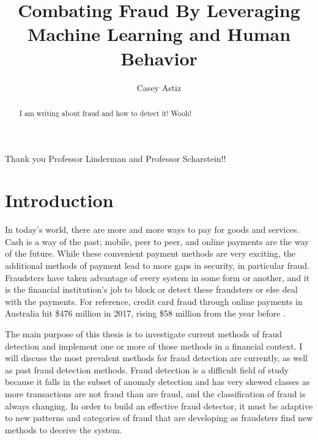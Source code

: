 \documentclass[midd]{thesis}
\title {Combating Fraud By Leveraging Machine Learning and Human Behavior}
\author {Casey Astiz}
\begin{document}
\maketitle
{}

\begin{abstract}
I am writing about fraud and how to detect it! Wooh!
\end{abstract}

\begin{acknowledgements}
Thank you Professor Linderman and Professor Scharstein!!
\end{acknowledgements}

\contentspage
\tablelistpage   %
\figurelistpage

\normalspacing \setcounter{page}{1} 

\chapter{Introduction}
\label{sec:intro}

In today's world, there are more and more ways to pay for goods and services. Cash is a way of the past; mobile, peer to peer, and online payments are the way of the future. While these convenient payment methods are very exciting, the additional methods of payment lead to more gaps in security, in particular fraud. Fraudsters have taken advantage of every system in some form or another, and it is the financial institution's job to block or detect these fraudsters or else deal with the payments. For reference, credit card fraud through online payments in Australia hit \$476 million in 2017, rising \$58 million from the year before \cite{Wang2018}.

The main purpose of this thesis is to investigate current methods of fraud detection and implement one or more of those methods in a financial context. I will discuss the most prevalent methods for fraud detection are currently, as well as past fraud detection methods. Fraud detection is a difficult field of study because it falls in the subset of anomaly detection and has very skewed classes as more transactions are not fraud than are fraud, and the classification of fraud is always changing. In order to build an effective fraud detector, it must be adaptive to new patterns and categories of fraud that are developing as fraudsters find new methods to deceive the system.
\end{document}

